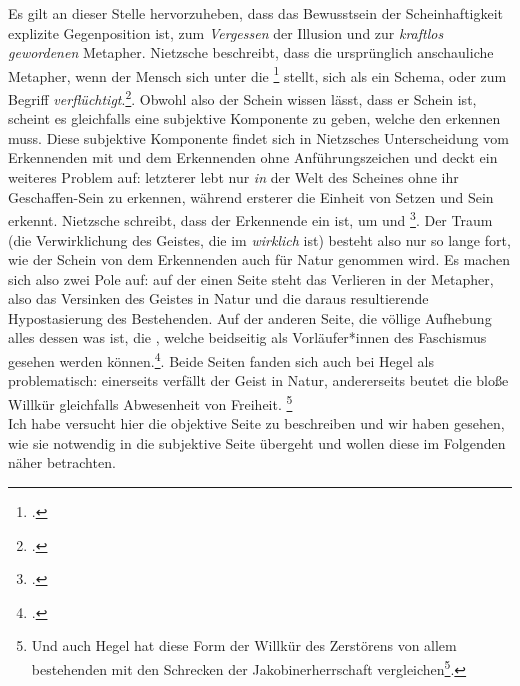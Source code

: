 \documentclass[12pt, a4paper, openany]{report}
\begin{document}
Es gilt an dieser Stelle hervorzuheben, dass das Bewusstsein der Scheinhaftigkeit explizite Gegenposition ist, zum \emph{Vergessen} der Illusion und zur \emph{kraftlos gewordenen} Metapher.
Nietzsche beschreibt, dass die ursprünglich anschauliche Metapher, wenn der Mensch sich unter die \footcite[][881]{nietzsche_geburt_1999} stellt, sich als ein Schema, oder zum Begriff \emph{verflüchtigt}.\footcite[Vgl.][881]{nietzsche_geburt_1999}.
Obwohl also der Schein wissen lässt, dass er Schein ist, scheint es gleichfalls eine subjektive Komponente zu geben, welche den  erkennen muss.
Diese subjektive Komponente findet sich in Nietzsches Unterscheidung vom Erkennenden mit und dem Erkennenden ohne Anführungszeichen und deckt ein weiteres Problem auf:
letzterer lebt nur \emph{in} der Welt des Scheines ohne ihr Geschaffen-Sein zu erkennen, während ersterer die Einheit von Setzen und Sein erkennt. 
Nietzsche schreibt, dass der Erkennende ein  ist, um  und \footcite[][§ 54, S. 417]{nietzsche_morgenrote_1999}.
Der Traum (die Verwirklichung des Geistes, die im  \emph{wirklich} ist) besteht also nur so lange fort, wie der Schein von dem Erkennenden auch für Natur genommen wird. 
Es machen sich also zwei Pole auf:
auf der einen Seite steht das Verlieren in der Metapher, also das Versinken des Geistes in Natur und die daraus resultierende Hypostasierung des Bestehenden.
Auf der anderen Seite, die völlige Aufhebung alles dessen was ist, die , welche beidseitig als Vorläufer*innen des Faschismus gesehen werden können.\footcite[Vgl.][???]{stephan_nietzscheanismus_2019}.
Beide Seiten fanden sich auch bei Hegel als problematisch:
einerseits verfällt der Geist in Natur, andererseits beutet die bloße Willkür gleichfalls Abwesenheit von Freiheit.%
\footnote{
    Und auch Hegel hat diese Form der Willkür des Zerstörens von allem bestehenden mit den Schrecken der Jakobinerherrschaft vergleichen\footcite[Vgl.][39]{hegel_grundlinien_2017}.
}\\

Ich habe versucht hier die objektive Seite zu beschreiben und wir haben gesehen, wie sie notwendig in die subjektive Seite übergeht und wollen diese im Folgenden näher betrachten.
\end{document}

